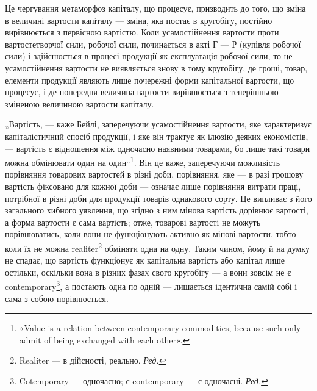 Це чергування метаморфоз капіталу, що процесує, призводить до
того, що зміна в величині вартости капіталу — зміна, яка постає в кругобігу,
постійно вирівнюється з первісною вартістю. Коли усамостійнення
вартости проти вартостетворчої сили, робочої сили, починається в акті
Г — Р (купівля робочої сили) і здійснюється в процесі продукції як
експлуатація робочої сили, то це усамостійнення вартости не виявляється
знову в тому кругобігу, де гроші, товар, елементи продукції являють
лише почережні форми капітальної вартости, що процесує, і де попередня
величина вартости вирівнюється з теперішньою зміненою величиною
вартости капіталу.

„Вартість, — каже Бейлі, заперечуючи усамостійнення вартости, яке
характеризує капіталістичний спосіб продукції, і яке він трактує як
ілюзію деяких економістів, — вартість є відношення між одночасно наявними
товарами, бо лише такі товари можна обмінювати один на один“\footnote*{
«Value is a relation between contemporary commodities, because such only
admit of being exchanged with each other».
}.
Він це каже, заперечуючи можливість порівняння товарових вартостей в
різні доби, порівняння, яке — в разі грошову вартість фіксовано для
кожної доби — означає лише порівняння витрати праці, потрібної в різні
доби для продукції товарів однакового сорту. Це випливає з його загального
хибного уявлення, що згідно з ним мінова вартість дорівнює
вартості, а форма вартости є сама вартість; отже, товарові вартості не
можуть порівнюватись, коли вони не функціонують активно як мінові вартости,
тобто коли їх не можна realiter\footnote*{
Realiter — в дійсності, реально. \emph{Ред.}
} обміняти одна на одну. Таким
чином, йому й на думку не спадає, що вартість функціонує як капітальна
вартість або капітал лише остільки, оскільки вона в різних фазах свого
кругобігу — а вони зовсім не є contemporary\footnote*{
Cotemporary — одночасно; є contemporary — є одночасні. \emph{Ред.}
}, а постають одна по
одній — лишається ідентична самій собі і сама з собою порівнюється.

